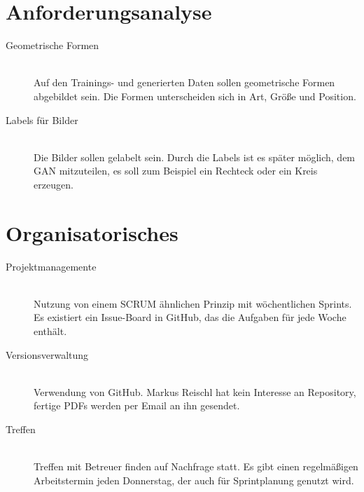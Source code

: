 
\newcommand{\Titel}{1. Protokoll}
\newcommand{\Teilnehmer}{Jonas Bürgel, Patrick Welter, Markus Reischl}
\newcommand{\DatumUndZeit}{15.09.2021 14:00-14:30}
\newcommand{\Ort}{Zoom Meeting}
\newcommand{\Thema}{Projekt aufsetzen und Thema einreichen}


\section{Anforderungsanalyse}
\begin{description}
	\item[Geometrische Formen] \hfill \\
	Auf den Trainings- und generierten Daten sollen geometrische Formen abgebildet sein. Die Formen unterscheiden sich in Art, Größe und Position.
	
	\item[Labels für Bilder] \hfill \\
	Die Bilder sollen gelabelt sein. Durch die Labels ist es später möglich, dem GAN mitzuteilen, es soll zum Beispiel ein Rechteck oder ein Kreis erzeugen.
\end{description}

\section{Organisatorisches}
\begin{description}
	\item[Projektmanagemente] \hfill \\
	Nutzung von einem SCRUM ähnlichen Prinzip mit wöchentlichen Sprints. Es existiert ein Issue-Board in GitHub, das die Aufgaben für jede Woche enthält.
	
	\item[Versionsverwaltung] \hfill \\
	Verwendung von GitHub. Markus Reischl hat kein Interesse an Repository, fertige PDFs werden per Email an ihn gesendet.
	
	\item[Treffen] \hfill \\
	Treffen mit Betreuer finden auf Nachfrage statt. Es gibt einen regelmäßigen Arbeitstermin jeden Donnerstag, der auch für Sprintplanung genutzt wird.
\end{description}

